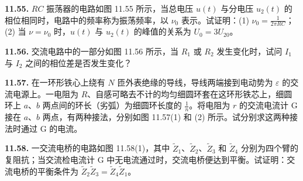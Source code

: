 \begin{center}
\end{center}

\vfill
\newpage

\textbf{11.55.} $RC$ 振荡器的电路如图 11.55 所示，当总电压 $u(t)$ 与分电压 $u_{2}(t)$ 的相位相同时，电路中的频率称为振荡频率，以 $\nu_{0}$ 表示。试证明：(1) $\displaystyle \nu_{0} = \frac{1}{2\pi RC}$；(2) 当 $\nu = \nu_0$ 时，$u(t)$ 与 $u_2(t)$ 的峰值的关系为 $U_0 = 3U_{20}$。

\begin{center}
\end{center}

\vfill
\newpage

\textbf{11.56.} 交流电路中的一部分如图 11.56 所示，当 $R_{1}$ 或 $R_{2}$ 发生变化时，试问 $I_{1}$ 与 $I_{2}$ 之间的相位差是否发生变化？

\begin{center}
\end{center}

\vfill
\newpage

\textbf{11.57.} 在一环形铁心上绕有 $N$ 匝外表绝缘的导线，导线两端接到电动势为 $\varepsilon$ 的交流电源上。一电阻为 $R$、自感可略去不计的均匀细圆环套在这环形铁芯上，细圆环上 $a$、$b$ 两点间的环长（劣弧）为细圆环长度的 $\displaystyle \frac{1}{n}$。将电阻为 $r$ 的交流电流计 $\mathrm{G}$ 接在 $a$、$b$ 两点，有两种接法，分别如图 11.57(1) 和 (2) 所示。试分别求这两种接法时通过 $\mathrm{G}$ 的电流。

\begin{center}
  \begin{minipage}[b]{0.47\linewidth}
    \centering
  \end{minipage}\hfill
  \begin{minipage}[b]{0.47\linewidth}
    \centering
  \end{minipage}
\end{center}

\vfill
\newpage

\textbf{11.58.} 一交流电桥的电路如图 11.58(1)，其中 $\widetilde{Z}_{1}$、$\widetilde{Z}_{2}$、$\widetilde{Z}_{3}$ 和 $\widetilde{Z}_{4}$ 分别为四个臂的复阻抗；当交流检电流计 $\mathrm{G}$ 中无电流通过时，交流电桥便达到平衡。试证明：交流电桥的平衡条件为 $\widetilde{Z}_{2}\widetilde{Z}_{3} = \widetilde{Z}_{4}\widetilde{Z}_{1}$。

